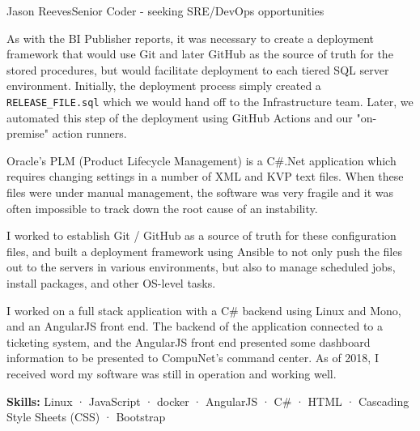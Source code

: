 \documentclass{article}
\begin{document}
\begin{cv}[avatar]{Jason Reeves}{Senior Coder - seeking SRE/DevOps opportunities}
\begin{cvevent}[2018-2020]
    \vspace*{3mm}
    As with the BI Publisher reports, it was necessary to create a deployment framework that would use Git and later GitHub as the source of truth for the stored procedures, but would facilitate deployment to each tiered SQL server environment.  Initially, the deployment process simply created a \texttt{RELEASE\_FILE.sql} which we would hand off to the Infrastructure team.  Later, we automated this step of the deployment using GitHub Actions and our "on-premise" action runners.
    \vspace*{5mm}
\end{cvevent}

\begin{cvevent}[2018-2020]
    Oracle's PLM (Product Lifecycle Management) is a C\#.Net application which requires changing settings in a number of XML and KVP text files.  When these files were under manual management, the software was very fragile and it was often impossible to track down the root cause of an instability.

    \vspace*{3mm}
    I worked to establish Git / GitHub as a source of truth for these configuration files, and built a deployment framework using Ansible to not only push the files out to the servers in various environments, but also to manage scheduled jobs, install packages, and other OS-level tasks.  
    \vspace*{5mm}
\end{cvevent}

\begin{cvevent}[Sep 2016][Sep 2017]
  I worked on a full stack application with a C\# backend using Linux and Mono, and an AngularJS front end. The backend of the application connected to a ticketing system, and the AngularJS front end presented some dashboard information to be presented to CompuNet's command center. As of 2018, I received word my software was still in operation and working well.
  
  \vspace*{3mm}
  \textbf{Skills:} Linux · JavaScript · docker · AngularJS · C\# · HTML · Cascading Style Sheets (CSS) · Bootstrap
  \vspace*{5mm}
\end{cvevent}


\end{cv}
\end{document}

